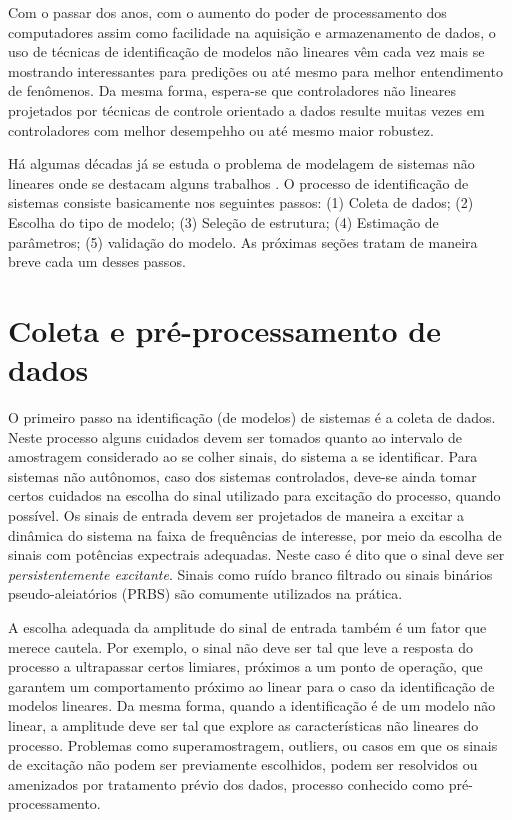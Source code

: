 Com o passar dos anos, com o aumento do poder de processamento dos computadores assim como facilidade na aquisição e armazenamento  de dados, o uso  de técnicas  de identificação de modelos não lineares vêm cada vez mais se mostrando interessantes para predições ou até mesmo para melhor entendimento de fenômenos. Da mesma forma, espera-se que controladores não lineares projetados por técnicas de controle orientado a dados resulte muitas vezes em controladores com melhor desempehho ou até mesmo maior robustez.

Há algumas décadas já se estuda o problema de modelagem de sistemas não lineares onde se destacam alguns trabalhos \citep{billings1980,leontaritis1985,leontaritis1985a,korenberg1988,billings1989,chen1990,chen1992,aguirre1995,aguirre2000,zhu2005}.
O processo de identificação de sistemas consiste basicamente nos seguintes passos: (1) Coleta de dados; (2) Escolha do tipo de modelo; (3) Seleção de estrutura; (4) Estimação de parâmetros; (5) validação do modelo. As próximas seções tratam de maneira breve cada um desses passos.

\section{Coleta e pré-processamento de dados}\label{sec:coleta}
O primeiro passo na identificação (de modelos) de sistemas é a coleta de dados. Neste processo alguns cuidados devem ser tomados quanto ao intervalo de amostragem considerado ao se colher sinais, do sistema a se identificar. Para sistemas não autônomos, caso dos sistemas controlados, deve-se ainda tomar certos cuidados na escolha do sinal utilizado para excitação do processo, quando possível. 
Os sinais de entrada devem ser projetados de maneira a excitar a dinâmica do sistema na faixa de frequências de interesse, por meio da escolha de sinais com potências expectrais adequadas. Neste caso é dito que o sinal deve ser \textit{persistentemente excitante}. Sinais como ruído branco filtrado ou sinais binários pseudo-aleiatórios (PRBS) são comumente  utilizados na prática.

A escolha adequada da amplitude do sinal de entrada também é um fator que merece cautela. Por exemplo, o sinal não deve ser tal que leve a resposta do processo a ultrapassar certos limiares,  próximos a um ponto de operação, que garantem um comportamento próximo ao linear para o caso da identificação de modelos lineares. Da mesma forma, quando a identificação é de um modelo não linear, a amplitude deve ser tal que explore as características não lineares do processo. 
Problemas como superamostragem, outliers, ou casos em que os sinais de excitação não podem ser previamente escolhidos, podem ser resolvidos ou amenizados por tratamento prévio dos dados, processo conhecido como pré-processamento. 


